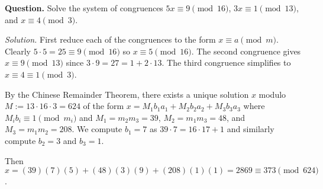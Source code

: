 \documentclass{article}
\begin{document}
{\bfseries Question.} Solve the system of congruences \( 5x \equiv 9 \pmod{16} \), \( 3x \equiv 1 \pmod{13} \), and \( x \equiv 4 \pmod 3 \).

{\itshape Solution.} First reduce each of the congruences to the form \( x \equiv a \pmod m \). Clearly \( 5 \cdot 5 = 25 \equiv  9 \pmod{16} \) so \( x \equiv 5 \pmod{16} \). The second congruence gives \( x \equiv 9 \pmod{13} \) since \( 3 \cdot 9 = 27 = 1+2 \cdot 13 \). The third congruence simplifies to \( x \equiv 4 \equiv 1 \pmod{3} \).

By the Chinese Remainder Theorem, there exists a unique solution \( x \) modulo \( M := 13 \cdot 16 \cdot 3 =  624 \) of the form \( x = M_1b_1a_1 + M_2b_2a_2 + M_3b_3a_3 \) where \( M_ib_i \equiv 1\pmod{m_i} \) and \( M_1 = m_2m_3 = 39 \), \( M_2 = m_1m_3 = 48 \), and \( M_3 = m_1m_2 = 208 \). We compute \( b_1 = 7 \) as \( 39 \cdot 7 = 16 \cdot 17 + 1 \) and similarly compute \( b_2 = 3 \) and \( b_3 = 1 \).
		
Then \( x = (39)(7)(5) + (48)(3)(9) + (208)(1)(1) = 2869 \equiv 373 \pmod{624} \).
\end{document}
